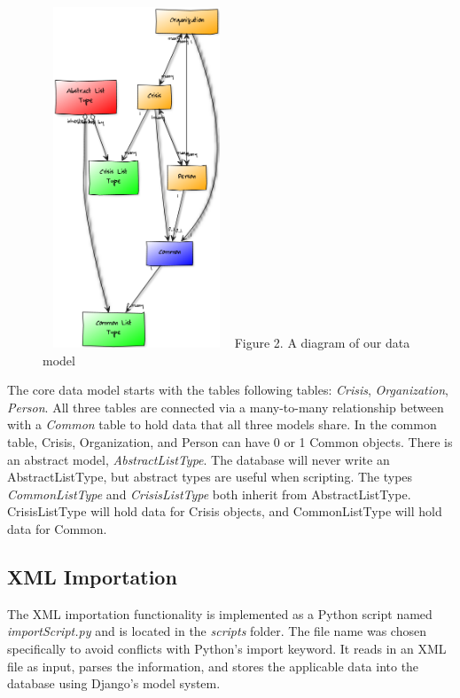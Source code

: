 \documentclass[12pt]{report}
\begin{document}
\begin{figure}
\vspace{-20pt}
\begin{flushright}
\includegraphics*[width=0.5\textwidth,height=4in]{dataModelDiagram.png}
\newline
\footnotesize
Figure 2. A diagram of our data model %
\end{flushright}
\end{figure}
\normalsize

The core data model starts with the tables following tables: \emph{Crisis}, \emph{Organization}, \emph{Person}.
All three tables are connected via a many-to-many relationship between with a \emph{Common} table to hold data that all three models share.
In the common table, Crisis, Organization, and Person can have 0 or 1 Common objects.
There is an abstract model, \emph{AbstractListType}.
The database will never write an AbstractListType, but abstract types are useful when scripting.
The types \emph{CommonListType} and \emph{CrisisListType} both inherit from AbstractListType.
CrisisListType will hold data for Crisis objects, and CommonListType will hold data for Common.


\subsection*{XML Importation}
\hfill


The XML importation functionality is implemented as a Python script named \emph{importScript.py} and is located in the \emph{scripts} folder.
The file name was chosen specifically to avoid conflicts with Python's import keyword.
It reads in an XML file as input, parses the information, and stores the applicable data into the database using Django's model system.\\
\end{document}
